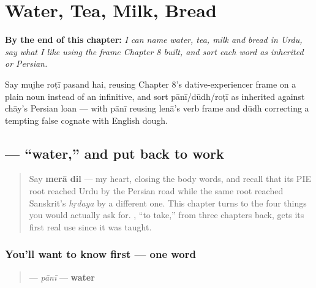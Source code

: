 
\chapter{Water, Tea, Milk, Bread}
\label{ch:ur-food-words}

\begin{chapteropening}
\textbf{By the end of this chapter:} \emph{I can name water, tea, milk and bread in Urdu, say what I like using the frame Chapter 8 built, and sort each word as inherited or Persian.}

Say mujhe roṭī pasand hai, reusing Chapter 8's dative-experiencer frame on a plain noun instead of an infinitive, and sort pānī/dūdh/roṭī as inherited against chāy's Persian loan — with pānī reusing lenā's verb frame and dūdh correcting a tempting false cognate with English dough.
\end{chapteropening}

\section[\texorpdfstring{\ur{پانی} (pānī)}{پانی (pānī)}]{ — \textquotedblleft{}water,\textquotedblright{} and  put back to work}

\label{lesson:UR-C12-pani}



\begin{quote}
Say \textbf{merā dil} — my heart, closing the body words, and recall that its PIE root reached Urdu by the Persian road while the same root reached Sanskrit's \emph{hṛdaya} by a different one. This chapter turns to the four things you would actually ask for. \textbf{}, \textquotedblleft{}to take,\textquotedblright{} from three chapters back, gets its first real use since it was taught.
\end{quote}

\subsection*{You'll want to know first — one word}
\begin{quote}
\textbf{} — \emph{pānī} — \textbf{water}
\end{quote}

